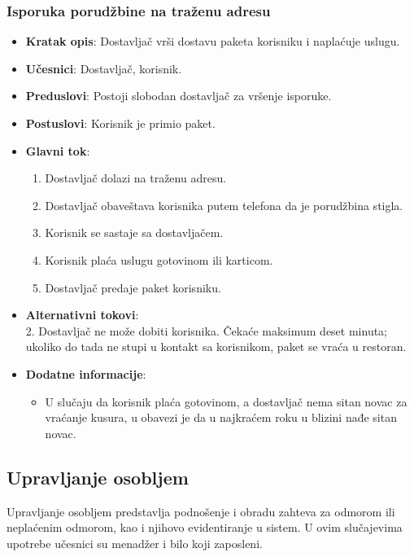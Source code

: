  \subsubsection{Isporuka porudžbine na traženu adresu}
 \begin{itemize}
    \item \textbf{Kratak opis}: Dostavljač vrši dostavu paketa korisniku i naplaćuje uslugu.
    \item \textbf{Učesnici}:
    Dostavljač, korisnik.
    \item \textbf{Preduslovi}:
    Postoji slobodan dostavljač za vršenje isporuke.
    \item \textbf{Postuslovi}:
    Korisnik je primio paket.
    \item \textbf{Glavni tok}:
    \begin{enumerate}
        \item Dostavljač dolazi na traženu adresu.
        \item Dostavljač obaveštava korisnika putem telefona da je porudžbina stigla.
        \item Korisnik se sastaje sa dostavljačem.
        \item Korisnik plaća uslugu gotovinom ili karticom.
        \item Dostavljač predaje paket korisniku.
 \end{enumerate}
    \item \textbf{Alternativni tokovi}:\\
        2. Dostavljač ne može dobiti korisnika. Čekaće maksimum deset minuta; ukoliko do tada ne stupi u kontakt sa korisnikom, paket se vraća u restoran.
    \item \textbf{Dodatne informacije}:
     \begin{itemize}
     \item U slučaju da korisnik plaća gotovinom, a dostavljač nema sitan novac za vraćanje kusura, u obavezi je da u najkraćem roku u blizini nađe sitan novac.
 \end{itemize}
 \end{itemize}
 
 \subsection{Upravljanje osobljem}
 Upravljanje osobljem predstavlja podno\v senje i obradu zahteva za odmorom ili nepla\'cenim odmorom, kao i njihovo evidentiranje u sistem. U ovim slu\v cajevima upotrebe u\v cesnici su menad\v zer i bilo koji zaposleni.
 

